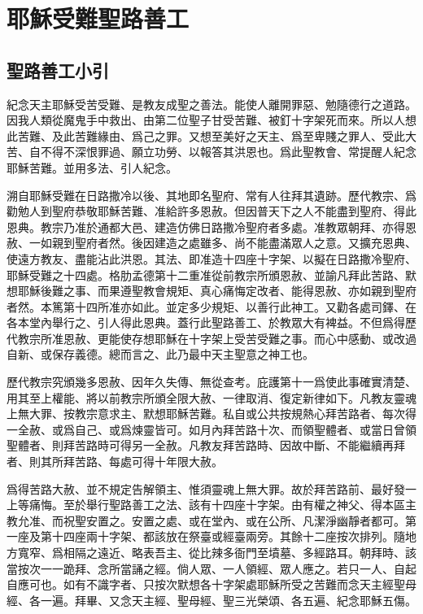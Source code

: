 \chapter[聖路善工]{耶穌受難聖路善工}
\section*{聖路善工小引}
紀念天主耶穌受苦受難、是教友成聖之善法。能使人離開罪惡、勉隨德行之道路。因我人類從魔鬼手中救出、由第二位聖子甘受苦難、被釘十字架死而來。所以人想此苦難、及此苦難緣由、爲己之罪。又想至美好之天主、爲至卑賤之罪人、受此大苦、自不得不深恨罪過、願立功勞、以報答其洪恩也。爲此聖教會、常提醒人紀念耶穌苦難。並用多法、引人紀念。

溯自耶穌受難在日路撒冷以後、其地即名聖府、常有人往拜其遺跡。歷代教宗、爲勸勉人到聖府恭敬耶穌苦難、准給許多恩赦。但因普天下之人不能盡到聖府、得此恩典。教宗乃准於通都大邑、建造仿佛日路撒冷聖府者多處。准教眾朝拜、亦得恩赦、一如親到聖府者然。後因建造之處雖多、尚不能盡滿眾人之意。又擴充恩典、使遠方教友、盡能沾此洪恩。其法、即准造十四座十字架、以擬在日路撒冷聖府、耶穌受難之十四處。格肋孟德第十二重准從前教宗所頒恩赦、並諭凡拜此苦路、默想耶穌後難之事、而果遵聖教會規矩、真心痛悔定改者、能得恩赦、亦如親到聖府者然。本篤第十四所准亦如此。並定多少規矩、以善行此神工。又勸各處司鐸、在各本堂內舉行之、引人得此恩典。蓋行此聖路善工、於教眾大有裨益。不但爲得歷代教宗所准恩赦、更能使存想耶穌在十字架上受苦受難之事。而心中感動、或改過自新、或保存義德。總而言之、此乃最中天主聖意之神工也。

歷代教宗究頒幾多恩赦、因年久失傳、無從查考。庇護第十一爲使此事確實清楚、用其至上權能、將以前教宗所頒全限大赦、一律取消、復定新律如下。凡教友靈魂上無大罪、按教宗意求主、默想耶穌苦難。私自或公共按規熱心拜苦路者、每次得一全赦、或爲自己、或爲煉靈皆可。如月內拜苦路十次、而領聖體者、或當日曾領聖體者、則拜苦路時可得另一全赦。凡教友拜苦路時、因故中斷、不能繼續再拜者、則其所拜苦路、每處可得十年限大赦。

爲得苦路大赦、並不規定告解領主、惟須靈魂上無大罪。故於拜苦路前、最好發一上等痛悔。至於舉行聖路善工之法、該有十四座十字架。由有權之神父、得本區主教允准、而祝聖安置之。安置之處、或在堂內、或在公所、凡潔淨幽靜者都可。第一座及第十四座兩十字架、都該放在祭臺或經臺兩旁。其餘十二座按次排列。隨地方寬窄、爲相隔之遠近、略表吾主、從比辣多衙門至墳墓、多經路耳。朝拜時、該當按次一一跪拜、念所當誦之經。倘人眾、一人領經、眾人應之。若只一人、自起自應可也。如有不識字者、只按次默想各十字架處耶穌所受之苦難而念天主經聖母經、各一遍。拜畢、又念天主經、聖母經、聖三光榮頌、各五遍、紀念耶穌五傷。

